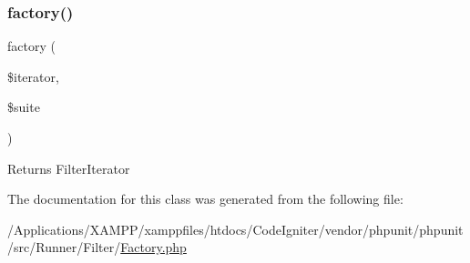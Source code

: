 \subsubsection{\texorpdfstring{factory()}{factory()}}
{\footnotesize\ttfamily factory (\begin{DoxyParamCaption}\item[{Iterator}]{\$iterator,  }\item[{\mbox{\hyperlink{class_p_h_p_unit___framework___test_suite}{P\+H\+P\+Unit\+\_\+\+Framework\+\_\+\+Test\+Suite}}}]{\$suite }\end{DoxyParamCaption})}

\begin{DoxyReturn}{Returns}
Filter\+Iterator 
\end{DoxyReturn}


The documentation for this class was generated from the following file\+:\begin{DoxyCompactItemize}
\item 
/\+Applications/\+X\+A\+M\+P\+P/xamppfiles/htdocs/\+Code\+Igniter/vendor/phpunit/phpunit/src/\+Runner/\+Filter/\mbox{\hyperlink{phpunit_2phpunit_2src_2_runner_2_filter_2_factory_8php}{Factory.\+php}}\end{DoxyCompactItemize}
